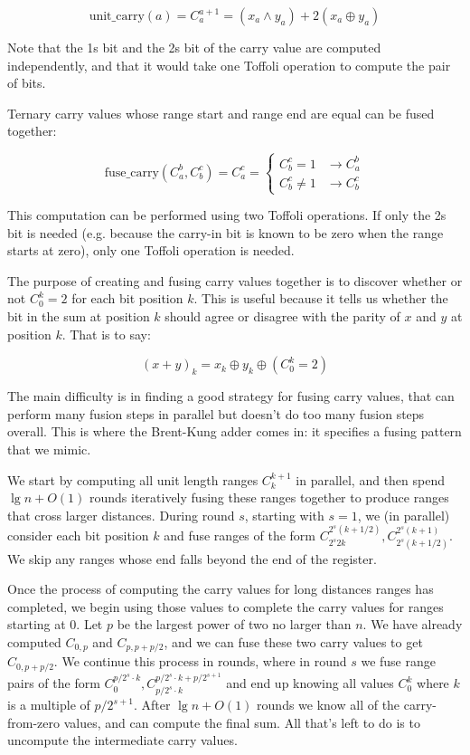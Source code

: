 \documentclass[onecolumn,unpublished]{quantumarticle}
\theoremstyle{definition}
\theoremstyle{definition}
\theoremstyle{definition}
\begin{document}
$$\text{unit\_carry}(a) = C_a^{a+1} = (x_a \land y_a) + 2 (x_a \oplus y_a)$$

Note that the 1s bit and the 2s bit of the carry value are computed independently, and that it would take one Toffoli operation to compute the pair of bits.

Ternary carry values whose range start and range end are equal can be fused together:

$$\text{fuse\_carry}(C_a^b, C_b^c) = C_a^c = \begin{cases}
C_b^c = 1 & \rightarrow C_a^b \\
C_b^c \neq 1 & \rightarrow C_b^c
\end{cases}$$

This computation can be performed using two Toffoli operations.
If only the 2s bit is needed (e.g. because the carry-in bit is known to be zero when the range starts at zero), only one Toffoli operation is needed.

The purpose of creating and fusing carry values together is to discover whether or not $C_0^k = 2$ for each bit position $k$.
This is useful because it tells us whether the bit in the sum at position $k$ should agree or disagree with the parity of $x$ and $y$ at position $k$.
That is to say:

$$(x + y)_k = x_k \oplus y_k \oplus (C_0^k = 2)$$

The main difficulty is in finding a good strategy for fusing carry values, that can perform many fusion steps in parallel but doesn't do too many fusion steps overall.
This is where the Brent-Kung adder comes in: it specifies a fusing pattern that we mimic.

We start by computing all unit length ranges $C_k^{k+1}$ in parallel, and then spend $\lg n + O(1)$ rounds iteratively fusing these ranges together to produce ranges that cross larger distances.
During round $s$, starting with $s=1$, we (in parallel) consider each bit position $k$ and fuse ranges of the form $C_{2^s 2k}^{2^s (k+1/2)}, C_{2^s (k+1/2) }^{2^s (k+1)}$.
We skip any ranges whose end falls beyond the end of the register.

Once the process of computing the carry values for long distances ranges has completed, we begin using those values to complete the carry values for ranges starting at 0.
Let $p$ be the largest power of two no larger than $n$.
We have already computed $C_{0,p}$ and $C_{p,p+p/2}$, and we can fuse these two carry values to get $C_{0,p+p/2}$.
We continue this process in rounds, where in round $s$ we fuse range pairs of the form $C_0^{p/2^s \cdot k}, C_{p/2^s \cdot k}^{p/2^s \cdot k+p/2^{s+1}}$ and end up knowing all values $C_{0}^{k}$ where $k$ is a multiple of $p/2^{s+1}$.
After $\lg n + O(1)$ rounds we know all of the carry-from-zero values, and can compute the final sum.
All that's left to do is to uncompute the intermediate carry values.
\end{document}
